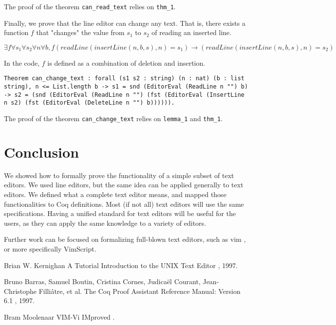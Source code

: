 \documentclass{article}
\theoremstyle{definition}
\begin{document}
The proof of the theorem \texttt{can\_read\_text} relies on \texttt{thm\_1}.

Finally, we prove that the line editor can change any text. That is, there exists a function \(f\) that "changes" the value from \(s_1\) to \(s_2\) of reading an inserted line.

\begin{center}
\(\exists f \forall s_1 \forall s_2 \forall n \forall b, f(readLine(insertLine( n, b, s ), n) = s_1) \to (readLine(insertLine( n, b, s ), n) = s_2)\)
\end{center}

In the code, \(f\) is defined as a combination of deletion and insertion.

\begin{lstlisting}
Theorem can_change_text : forall (s1 s2 : string) (n : nat) (b : list string), n <= List.length b -> s1 = snd (EditorEval (ReadLine n "") b) -> s2 = (snd (EditorEval (ReadLine n "") (fst (EditorEval (InsertLine n s2) (fst (EditorEval (DeleteLine n "") b)))))).
\end{lstlisting}

The proof of the theorem \texttt{can\_change\_text} relies on \texttt{lemma\_1} and \texttt{thm\_1}.

\section{Conclusion}
We showed how to formally prove the functionality of a simple subset of text editors. We used line editors, but the same idea can be applied generally to text editors. We defined what a complete text editor means, and mapped those functionalities to Coq definitions. Most (if not all) text editors will use the same specifications. Having a unified standard for text editors will be useful for the users, as they can apply the same knowledge to a variety of editors.

Further work can be focused on formalizing full-blown text editors, such as vim \cite{b3}, or more specifically VimScript.

\begin{thebibliography}{1}

Brian W. Kernighan
\newblock A Tutorial Introduction to the UNIX Text Editor
, 1997.

Bruno Barras, Samuel Boutin, Cristina Cornes, Judicaël Courant, Jean-Christophe Filliâtre, et al.
\newblock The Coq Proof Assistant Reference Manual: Version 6.1
, 1997.

Bram Moolenaar
\newblock VIM-Vi IMproved
.

\end{thebibliography}
\end{document}
